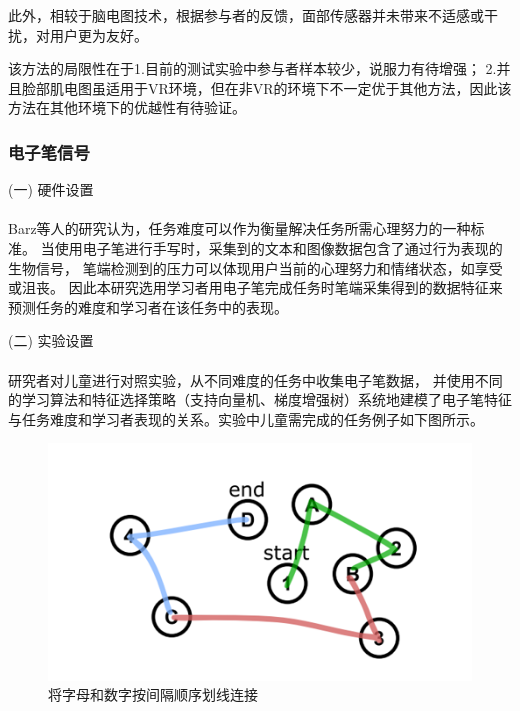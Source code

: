 \documentclass{article}
\begin{document}
            此外，相较于脑电图技术，根据参与者的反馈，面部传感器并未带来不适感或干扰，对用户更为友好。

            该方法的局限性在于1.目前的测试实验中参与者样本较少，说服力有待增强；
            2.并且脸部肌电图虽适用于VR环境，但在非VR的环境下不一定优于其他方法，因此该方法在其他环境下的优越性有待验证。

            \subsubsection{电子笔信号}
            (一) 硬件设置\paragraph{}
            Barz等人\cite{ref10}的研究认为，任务难度可以作为衡量解决任务所需心理努力的一种标准。
            当使用电子笔进行手写时，采集到的文本和图像数据包含了通过行为表现的生物信号，
            笔端检测到的压力可以体现用户当前的心理努力和情绪状态，如享受或沮丧。
            因此本研究选用学习者用电子笔完成任务时笔端采集得到的数据特征来预测任务的难度和学习者在该任务中的表现。

            (二) 实验设置\paragraph{}
            研究者对儿童进行对照实验，从不同难度的任务中收集电子笔数据，
            并使用不同的学习算法和特征选择策略（支持向量机、梯度增强树）系统地建模了电子笔特征与任务难度和学习者表现的关系。实验中儿童需完成的任务例子如下图所示。

            \begin{figure}[H]
            	
            	\centering
            	\includegraphics[scale=0.5]{images/digital_pen.png}
            	\caption{将字母和数字按间隔顺序划线连接}
            	\label{fig:label}
            \end{figure}
\end{document}

